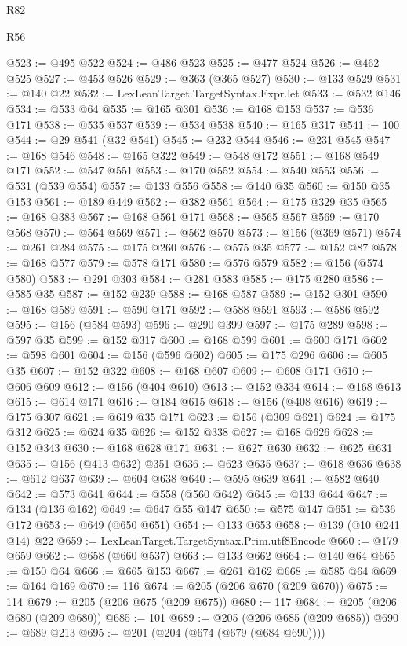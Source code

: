 \begin{lexlean}{R82}
\begin{lexlean}{R56}
\begin{coremodule}
{{{{{{{{{{{{{{{{{{{{{{{{{{{{{{{{{{{{{{{{{{{{{{{{{{{{{{{{{{{{{{{{{{{{{{{{{{{{{{{{{{{{{{{{{{{{{{{{{{{{{{{{{{{{{{{{{{{{{{{{{{{{{{{{{{{{{{{{{{{{{{{{{{{{{{{{{{{{{{{{{{{{{{{{{{{{{{{{{{{{{{{{{{{{{{{{{{{{{{{{{{{{{{{{{{{@523 := @495 @522
@524 := @486 @523
@525 := @477 @524
@526 := @462 @525
@527 := @453 @526
@529 := @363 (@365 @527)
@530 := @133 @529
@531 := @140 @22
@532 := LexLeanTarget.TargetSyntax.Expr.let
@533 := @532 @146
@534 := @533 @64
@535 := @165 @301
@536 := @168 @153
@537 := @536 @171
@538 := @535 @537
@539 := @534 @538
@540 := @165 @317
@541 := 100
@544 := @29 @541 (@32 @541)
@545 := @232 @544
@546 := @231 @545
@547 := @168 @546
@548 := @165 @322
@549 := @548 @172
@551 := @168 @549 @171
@552 := @547 @551
@553 := @170 @552
@554 := @540 @553
@556 := @531 (@539 @554)
@557 := @133 @556
@558 := @140 @35
@560 := @150 @35 @153
@561 := @189 @449
@562 := @382 @561
@564 := @175 @329 @35
@565 := @168 @383
@567 := @168 @561 @171
@568 := @565 @567
@569 := @170 @568
@570 := @564 @569
@571 := @562 @570
@573 := @156 (@369 @571)
@574 := @261 @284
@575 := @175 @260
@576 := @575 @35
@577 := @152 @87
@578 := @168 @577
@579 := @578 @171
@580 := @576 @579
@582 := @156 (@574 @580)
@583 := @291 @303
@584 := @281 @583
@585 := @175 @280
@586 := @585 @35
@587 := @152 @239
@588 := @168 @587
@589 := @152 @301
@590 := @168 @589
@591 := @590 @171
@592 := @588 @591
@593 := @586 @592
@595 := @156 (@584 @593)
@596 := @290 @399
@597 := @175 @289
@598 := @597 @35
@599 := @152 @317
@600 := @168 @599
@601 := @600 @171
@602 := @598 @601
@604 := @156 (@596 @602)
@605 := @175 @296
@606 := @605 @35
@607 := @152 @322
@608 := @168 @607
@609 := @608 @171
@610 := @606 @609
@612 := @156 (@404 @610)
@613 := @152 @334
@614 := @168 @613
@615 := @614 @171
@616 := @184 @615
@618 := @156 (@408 @616)
@619 := @175 @307
@621 := @619 @35 @171
@623 := @156 (@309 @621)
@624 := @175 @312
@625 := @624 @35
@626 := @152 @338
@627 := @168 @626
@628 := @152 @343
@630 := @168 @628 @171
@631 := @627 @630
@632 := @625 @631
@635 := @156 (@413 @632) @351
@636 := @623 @635
@637 := @618 @636
@638 := @612 @637
@639 := @604 @638
@640 := @595 @639
@641 := @582 @640
@642 := @573 @641
@644 := @558 (@560 @642)
@645 := @133 @644
@647 := @134 (@136 @162)
@649 := @647 @55 @147
@650 := @575 @147
@651 := @536 @172
@653 := @649 (@650 @651)
@654 := @133 @653
@658 := @139 (@10 @241 @14) @22
@659 := LexLeanTarget.TargetSyntax.Prim.utf8Encode
@660 := @179 @659
@662 := @658 (@660 @537)
@663 := @133 @662
@664 := @140 @64
@665 := @150 @64
@666 := @665 @153
@667 := @261 @162
@668 := @585 @64
@669 := @164 @169
@670 := 116
@674 := @205 (@206 @670 (@209 @670))
@675 := 114
@679 := @205 (@206 @675 (@209 @675))
@680 := 117
@684 := @205 (@206 @680 (@209 @680))
@685 := 101
@689 := @205 (@206 @685 (@209 @685))
@690 := @689 @213
@695 := @201 (@204 (@674 (@679 (@684 @690))))
}}}}}}}}}}}}}}}}}}}}}}}}}}}}}}}}}}}}}}}}}}}}}}}}}}}}}}}}}}}}}}}}}}}}}}}}}}}}}}}}}}}}}}}}}}}}}}}}}}}}}}}}}}}}}}}}}}}}}}}}}}}}}}}}}}}}}}}}}}}}}}}}}}}}}}}}}}}}}}}}}}}}}}}}}}}}}}}}}}}}}}}}}}}}}}}}}}}}}}}}}}}}}}}}}}}
\end{coremodule}
\end{lexlean}
\end{lexlean}
